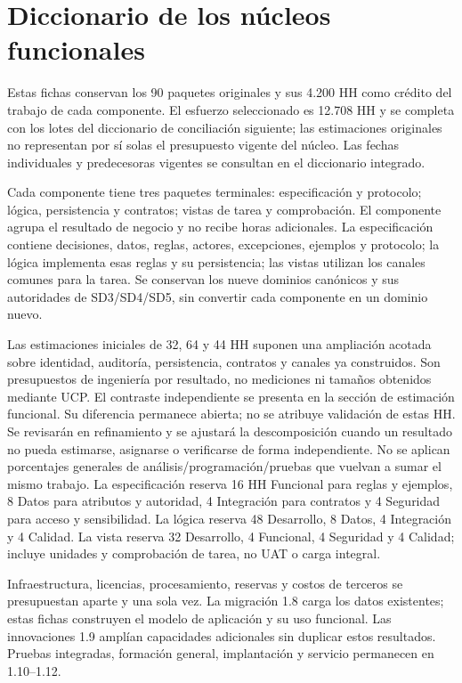 \section{Diccionario de los núcleos funcionales}
Estas fichas conservan los 90 paquetes originales y sus 4.200 HH como crédito del trabajo de cada componente. El esfuerzo seleccionado es 12.708 HH y se completa con los lotes del diccionario de conciliación siguiente; las estimaciones originales no representan por sí solas el presupuesto vigente del núcleo. Las fechas individuales y predecesoras vigentes se consultan en el diccionario integrado.

Cada componente tiene tres paquetes terminales: especificación y protocolo; lógica, persistencia y contratos; vistas de tarea y comprobación. El componente agrupa el resultado de negocio y no recibe horas adicionales. La especificación contiene decisiones, datos, reglas, actores, excepciones, ejemplos y protocolo; la lógica implementa esas reglas y su persistencia; las vistas utilizan los canales comunes para la tarea. Se conservan los nueve dominios canónicos y sus autoridades de SD3/SD4/SD5, sin convertir cada componente en un dominio nuevo.

Las estimaciones iniciales de 32, 64 y 44 HH suponen una ampliación acotada sobre identidad, auditoría, persistencia, contratos y canales ya construidos. Son presupuestos de ingeniería por resultado, no mediciones ni tamaños obtenidos mediante UCP. El contraste independiente se presenta en la sección de estimación funcional. Su diferencia permanece abierta; no se atribuye validación de estas HH. Se revisarán en refinamiento y se ajustará la descomposición cuando un resultado no pueda estimarse, asignarse o verificarse de forma independiente. No se aplican porcentajes generales de análisis/programación/pruebas que vuelvan a sumar el mismo trabajo. La especificación reserva 16 HH Funcional para reglas y ejemplos, 8 Datos para atributos y autoridad, 4 Integración para contratos y 4 Seguridad para acceso y sensibilidad. La lógica reserva 48 Desarrollo, 8 Datos, 4 Integración y 4 Calidad. La vista reserva 32 Desarrollo, 4 Funcional, 4 Seguridad y 4 Calidad; incluye unidades y comprobación de tarea, no UAT o carga integral.

 Infraestructura, licencias, procesamiento, reservas y costos de terceros se presupuestan aparte y una sola vez. La migración 1.8 carga los datos existentes; estas fichas construyen el modelo de aplicación y su uso funcional. Las innovaciones 1.9 amplían capacidades adicionales sin duplicar estos resultados. Pruebas integradas, formación general, implantación y servicio permanecen en 1.10--1.12.

